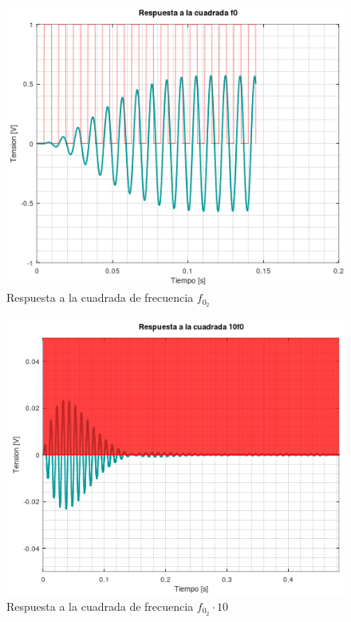 \documentclass[11pt,a4paper]{report}
\begin{document}
\newpage
\begin{figure}[h!]
\includegraphics[scale=1]{RtaCuadradaWo22.png}
\caption{Respuesta a la cuadrada de frecuencia $f_{0_{2}}$}
\end{figure}

\newpage
\begin{figure}[h!]
\includegraphics[scale=1]{RtaCuadradaWo23.png}
\caption{Respuesta a la cuadrada de frecuencia $f_{0_{2}} \cdot 10$}
\end{figure}
\end{document}
